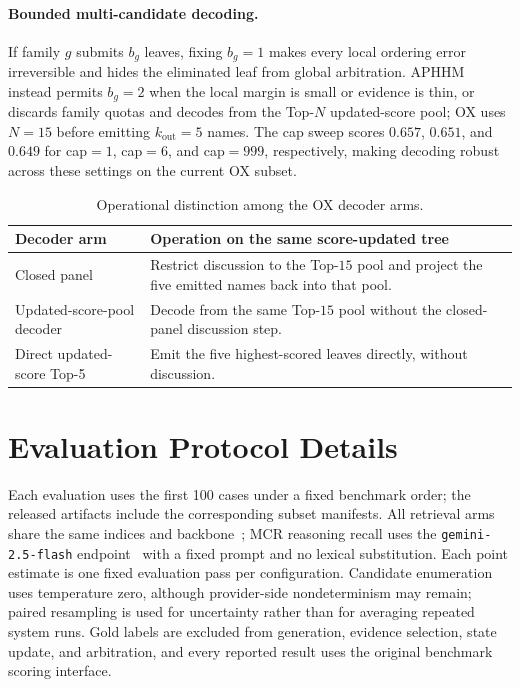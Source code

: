 \documentclass[letterpaper]{article}
\begin{document}
\paragraph{Bounded multi-candidate decoding.}
If family $g$ submits $b_g$ leaves, fixing $b_g{=}1$ makes every local ordering error irreversible and hides the eliminated leaf from global arbitration.
APHHM instead permits $b_g{=}2$ when the local margin is small or evidence is thin, or discards family quotas and decodes from the Top-$N$ updated-score pool; OX uses $N{=}15$ before emitting $k_{\mathrm{out}}{=}5$ names.
The cap sweep scores $0.657$, $0.651$, and $0.649$ for cap${=}1$, cap${=}6$, and cap${=}999$, respectively, making decoding robust across these settings on the current OX subset.

\begin{table}[tb]
\centering
\small
\begin{tabular}{@{}p{2.15cm}p{4.45cm}@{}}
\toprule
Decoder arm & Operation on the same score-updated tree \\
\midrule
Closed panel & Restrict discussion to the Top-$15$ pool and project the five emitted names back into that pool. \\
Updated-score-pool decoder & Decode from the same Top-$15$ pool without the closed-panel discussion step. \\
Direct updated-score Top-5 & Emit the five highest-scored leaves directly, without discussion. \\
\bottomrule
\end{tabular}
\caption{Operational distinction among the OX decoder arms.}
\label{tab:decoder-contract}
\end{table}

\section{Evaluation Protocol Details}

Each evaluation uses the first 100 cases under a fixed benchmark order; the released artifacts include the corresponding subset manifests.
All retrieval arms share the same indices and  backbone~\cite{llama33}; MCR reasoning recall uses the \texttt{gemini-2.5-flash} endpoint~\cite{gemini25flash} with a fixed prompt and no lexical substitution.
Each point estimate is one fixed evaluation pass per configuration.
Candidate enumeration uses temperature zero, although provider-side nondeterminism may remain; paired resampling is used for uncertainty rather than for averaging repeated system runs.
Gold labels are excluded from generation, evidence selection, state update, and arbitration, and every reported result uses the original benchmark scoring interface.
\end{document}

